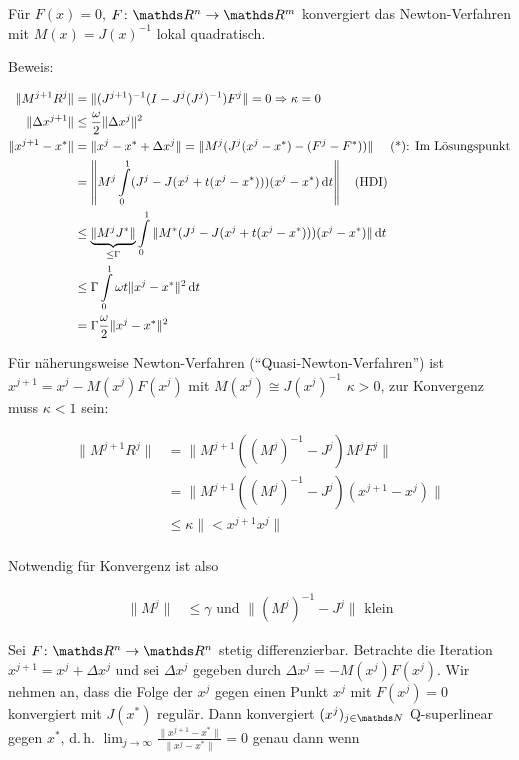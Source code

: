 
Für $F(x)=0$, $F\colon \R^n \to \R^m$ konvergiert das Newton-Verfahren mit $M(x) = J(x)^{-1}$ lokal quadratisch.

Beweis:

\begin{align*}
\| M^{j+1} R^j \| &= \| (J^{j+1})^{-1} (I - J^j (J^j)^{-1}) F^j\| = 0 \Rightarrow \kappa = 0 \\
\|\Delta x^{j+1} \| & \leq \frac \omega 2 \| \Delta x^j \|^2 \\
\|x^{j+1} - x^* \| &= \|x^j - x^* + \Delta x^j \| = \| M^j ( J^j(x^j-x^*) - (F^j - F^*)) \| \quad \text{ (*): Im Lösungspunkt}\\
&= \left\| M^j \int\limits_0^1 (J^j-J(x^j + t(x^j-x^*))) (x^j-x^*) \,\mathrm d t \right\| \quad \text{(HDI)} \\
&\leq \underbrace{\|M^j J^*\|}_{\leq \Gamma} \int\limits_0^1 \| M^*(J^j-J(x^j+t(x^j-x^*)))(x^j-x^*) \| \,\mathrm d t \\
&\leq \Gamma \int\limits_0^1 \omega t \|x^j - x^*\|^2 \,\mathrm d t \\
&= \Gamma \frac \omega 2 \|x^j - x^*\|^2 \\
\end{align*}



Für näherungsweise Newton-Verfahren ("`Quasi-Newton-Verfahren"') ist $x^{j+1} = x^j - M(x^j) F(x^j)$ mit $M(x^j) \cong J(x^j)^{-1}$ $\kappa > 0$, zur Konvergenz muss $\kappa < 1$ sein:

\begin{align*}
\|M^{j+1} R^j\| &= \|M^{j+1} ((M^j)^{-1} - J^j) M^j F^j \| \\
&= \| M^{j+1} ((M^j)^{-1} - J^j) (x^{j+1} - x^j) \| \\
&\leq \kappa \|<x^{j+1} x^j\| \\
\end{align*}

Notwendig für Konvergenz ist also

\begin{align*}
\|M^j\| & \leq \gamma \text{ und } \|(M^j)^{-1}-J^j\| \text{ klein} 
\end{align*}


Sei $F\colon \R^n \to \R^n$ stetig differenzierbar. Betrachte die Iteration $x^{j+1} = x^j + \Delta x^j$ und sei $\Delta x^j$ gegeben durch $\Delta x^j = -M(x^j) F(x^j)$. Wir nehmen an, dass die Folge der $x^j$ gegen einen Punkt $x^j$ mit $F(x^j) = 0$ konvergiert mit $J(x^*)$ regulär. Dann konvergiert $(x^j)_{j\in \N}$ Q-superlinear gegen $x^*$, d.\,h. $\lim_{j\to \infty} \frac{\|x^{j+1} - x^*\|}{\|x^j-x^*\|} = 0$ genau dann wenn

